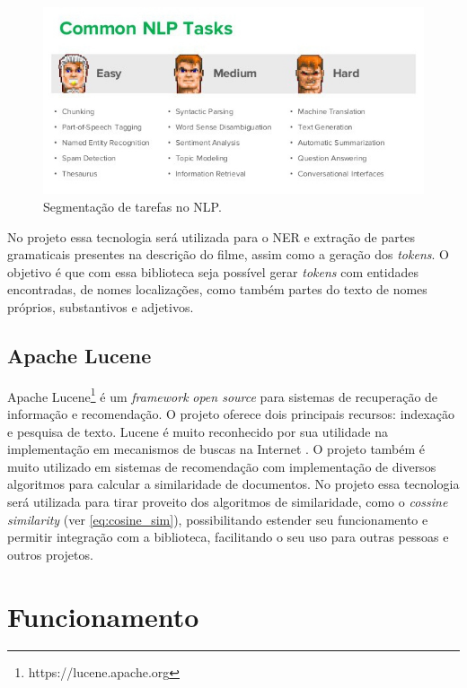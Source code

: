 \begin{figure}
	\centering
	\includegraphics[scale=0.70]{imagens/nlp.jpg}
	\caption{Segmentação de tarefas no NLP. \citep{NLP2016}}
	\label{fig:nlp}
\end{figure}

No projeto essa tecnologia será utilizada para o \ac{NER} e extração de partes gramaticais presentes na descrição do filme, assim como a geração dos \textit{tokens}. O objetivo é que com essa biblioteca seja possível gerar \textit{tokens} com entidades encontradas, de nomes localizações, como também partes do texto de nomes próprios, substantivos e adjetivos.

\subsection{Apache Lucene}

Apache Lucene\footnote{https://lucene.apache.org} é um \textit{framework} \textit{open source} para sistemas de recuperação de informação e recomendação. O projeto oferece dois principais recursos: indexação e pesquisa de texto. Lucene é muito reconhecido por sua utilidade na implementação em mecanismos de buscas na Internet \citep{McCandless2010}. O projeto também é muito utilizado em sistemas de recomendação com implementação de diversos algoritmos para calcular a similaridade de documentos.
No projeto essa tecnologia será utilizada para tirar proveito dos algoritmos de similaridade, como o \textit{cossine similarity} (ver \ref{eq:cosine_sim}), possibilitando estender seu funcionamento e permitir integração com a biblioteca, facilitando o seu uso para outras pessoas e outros projetos.

\section{Funcionamento}

